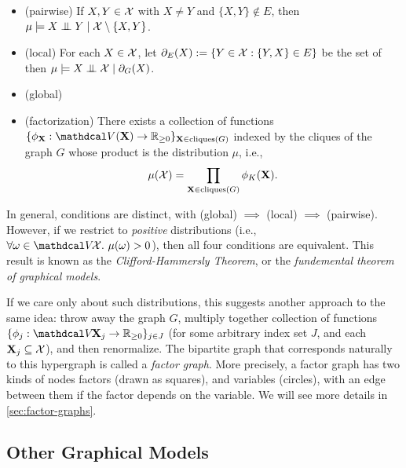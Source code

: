 \begin{itemize}[nosep]
    \item (pairwise) 
        If $X,Y \in \mathcal X$ with $X \ne Y$ and $\{X, Y\} \notin E$, then 
        $
        \mu \models
            X \mathrel{\perp\mspace{-10mu}\perp} Y \mid \mathcal X \setminus \{X, Y\}$.  
    \item (local) 
        For each $X \in \mathcal X$, let $\partial_E(X) := \{ Y \in \mathcal X : \{Y,X\} \in E \}$ be the set of 
        then $
            \mu \models
        X \mathrel{\perp\mspace{-10mu}\perp} \mathcal X \mid \partial_G(X)$.  
    \item (global)
    \item (factorization) 
        There exists a collection of functions 
        $\{ \phi_{\mat X} : \V(\mat X)\to \mathbb R_{\ge 0} \}_{\mat X \in \mathrm{cliques}(G)}$
        indexed by the cliques of the graph $G$
        whose product is the distribution $\mu$,
        i.e.,
        \[
            \mu(\mathcal X) = \prod_{\mathbf X \in \mathrm{cliques}(G)} \phi_K(\mathbf X).
        \]
\end{itemize}

In general, conditions are distinct, with (global) $\implies$ (local) $\implies$ (pairwise). 
However, if we restrict to \emph{positive} distributions (i.e., $\forall \omega \in \V\!\X.~\mu(\omega) > 0 $), then all four conditions are equivalent.
This result is
known as the \emph{Clifford-Hammersly Theorem}, or the \emph{fundemental theorem of graphical models}. 

If we care only about such distributions, this suggests another approach to the same idea: throw away the graph $G$, multiply together collection of functions $\{ \phi_{j} : \V \! \mat X_{j} \to \mathbb R_{\ge 0} \}_{j \in J}$ (for some arbitrary index set $J$, and each $\mathbf X_j \subseteq \mathcal X$), and then renormalize. 
%
The bipartite graph that corresponds naturally to this hypergraph is called a \emph{factor graph}. 
More precisely, a factor graph has two kinds of nodes factors (drawn as squares), and variables (circles), with an edge between them if the factor depends on the variable.
We will see more details in \cref{sec:factor-graphs}.


\subsection{Other Graphical Models}
    \label{sec:prelim-other-pgms}

